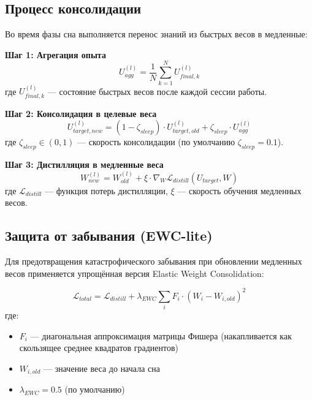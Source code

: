 \subsection{Процесс консолидации}

Во время фазы сна выполняется перенос знаний из быстрых весов в медленные:

\textbf{Шаг 1: Агрегация опыта}
\begin{equation}
U_{agg}^{(l)} = \frac{1}{N} \sum_{k=1}^{N} U_{final, k}^{(l)}
\label{eq:aggregation}
\end{equation}
где $U_{final, k}^{(l)}$ — состояние быстрых весов после каждой сессии работы.

\textbf{Шаг 2: Консолидация в целевые веса}
\begin{equation}
U_{target, new}^{(l)} = (1 - \zeta_{sleep}) \cdot U_{target, old}^{(l)} + \zeta_{sleep} \cdot U_{agg}^{(l)}
\label{eq:consolidation}
\end{equation}
где $\zeta_{sleep} \in (0, 1)$ — скорость консолидации (по умолчанию $\zeta_{sleep} = 0.1$).

\textbf{Шаг 3: Дистилляция в медленные веса}
\begin{equation}
W_{new}^{(l)} = W_{old}^{(l)} + \xi \cdot \nabla_W \mathcal{L}_{distill}(U_{target}, W)
\label{eq:distillation}
\end{equation}
где $\mathcal{L}_{distill}$ — функция потерь дистилляции, $\xi$ — скорость обучения медленных весов.

\subsection{Защита от забывания (EWC-lite)}

Для предотвращения катастрофического забывания при обновлении медленных весов применяется упрощённая версия Elastic Weight Consolidation:

\begin{equation}
\mathcal{L}_{total} = \mathcal{L}_{distill} + \lambda_{EWC} \sum_i F_i \cdot (W_i - W_{i, old})^2
\label{eq:ewc}
\end{equation}
где:
\begin{itemize}
    \item $F_i$ — диагональная аппроксимация матрицы Фишера (накапливается как скользящее среднее квадратов градиентов)
    \item $W_{i, old}$ — значение веса до начала сна
    \item $\lambda_{EWC} = 0.5$ (по умолчанию)
\end{itemize}

